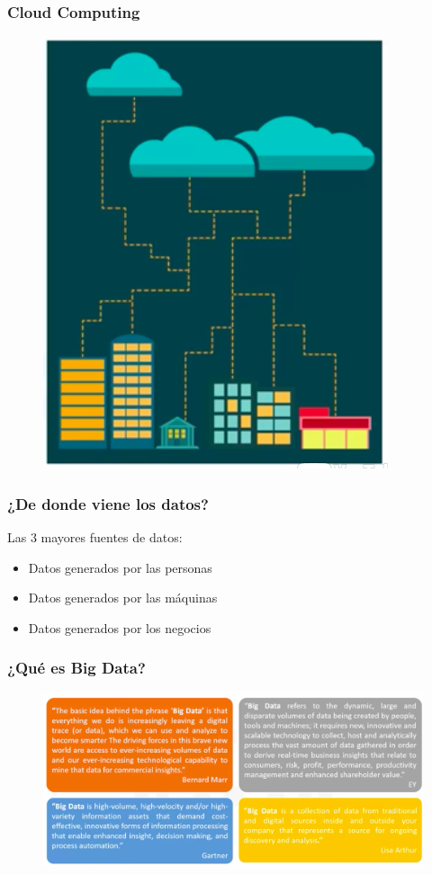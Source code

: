 \documentclass{beamer}
\begin{document}
\begin{frame}
\frametitle{Cloud Computing}
\begin{figure}
\includegraphics[scale=0.35]{img/2_CloudComputing}
\end{figure}
\end{frame}

\begin{frame}
\frametitle{¿De donde viene los datos?}
Las 3 mayores fuentes de datos: \\
\begin{itemize}
\item Datos generados por las personas
\item Datos generados por las m\'aquinas
\item Datos generados por los negocios
\end{itemize}
\end{frame}


\begin{frame}
\frametitle{¿Qu\'e es Big Data?}
\begin{figure}
\includegraphics[scale=0.18]{img/1_BigData_Definition}
\end{figure}
\end{frame}
\end{document}
